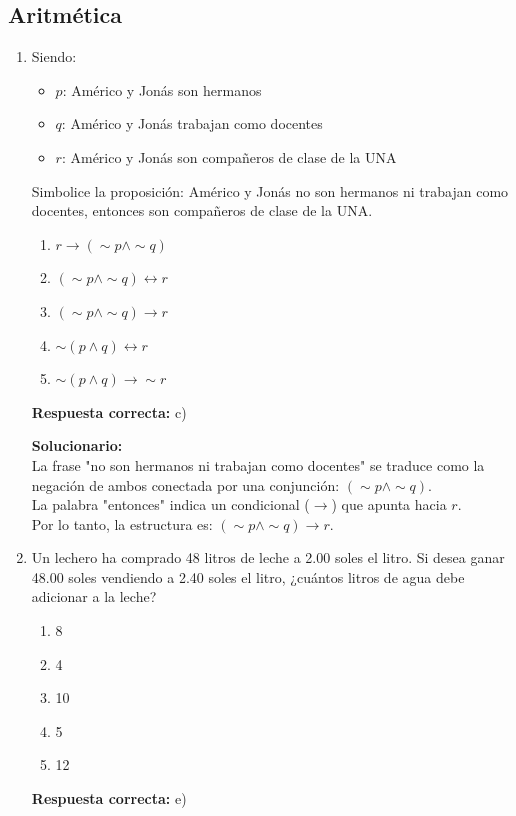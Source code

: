 \subsection*{Aritmética}

\begin{enumerate}
	
	\item Siendo:
	\begin{itemize}
		\item[] $p$: Américo y Jonás son hermanos
		\item[] $q$: Américo y Jonás trabajan como docentes
		\item[] $r$: Américo y Jonás son compañeros de clase de la UNA
	\end{itemize}
	
	Simbolice la proposición:
	Américo y Jonás no son hermanos ni trabajan como docentes, entonces son compañeros de clase de la UNA.
	
	\begin{enumerate}[label=\alph*)]
		\item $r \rightarrow (\sim p \wedge \sim q)$
		\item $(\sim p \wedge \sim q) \leftrightarrow r$
		\item $(\sim p \wedge \sim q) \rightarrow r$
		\item $\sim (p \wedge q) \leftrightarrow r$
		\item $\sim (p \wedge q) \rightarrow \sim r$
	\end{enumerate}
	\textbf{Respuesta correcta:} c)
	
	\vspace{2mm}
	\textbf{Solucionario:}\\
	La frase "no son hermanos ni trabajan como docentes" se traduce como la negación de ambos conectada por una conjunción: $(\sim p \wedge \sim q)$.\\
	La palabra "entonces" indica un condicional ($\rightarrow$) que apunta hacia $r$.\\
	Por lo tanto, la estructura es: $(\sim p \wedge \sim q) \rightarrow r$.
	
	\vspace{6mm}
	
	\item Un lechero ha comprado 48 litros de leche a 2.00 soles el litro. Si desea ganar 48.00 soles vendiendo a 2.40 soles el litro, ¿cuántos litros de agua debe adicionar a la leche?
	
	\begin{enumerate}[label=\alph*)]
		\item 8
		\item 4
		\item 10
		\item 5
		\item 12
	\end{enumerate}
	\textbf{Respuesta correcta:} e)
	

\end{enumerate}
